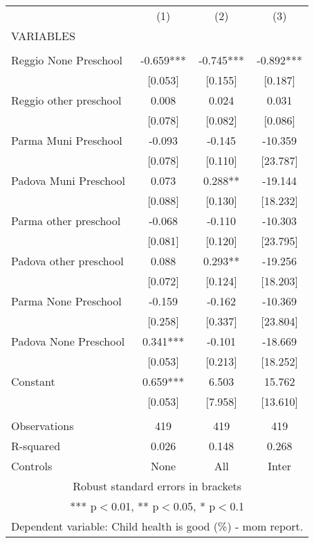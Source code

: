 \begin{tabular}{lccc} \hline
 & (1) & (2) & (3) \\
VARIABLES &  &  &  \\ \hline
 &  &  &  \\
Reggio None Preschool & -0.659*** & -0.745*** & -0.892*** \\
 & [0.053] & [0.155] & [0.187] \\
Reggio other preschool & 0.008 & 0.024 & 0.031 \\
 & [0.078] & [0.082] & [0.086] \\
Parma Muni Preschool & -0.093 & -0.145 & -10.359 \\
 & [0.078] & [0.110] & [23.787] \\
Padova Muni Preschool & 0.073 & 0.288** & -19.144 \\
 & [0.088] & [0.130] & [18.232] \\
Parma other preschool & -0.068 & -0.110 & -10.303 \\
 & [0.081] & [0.120] & [23.795] \\
Padova other preschool & 0.088 & 0.293** & -19.256 \\
 & [0.072] & [0.124] & [18.203] \\
Parma None Preschool & -0.159 & -0.162 & -10.369 \\
 & [0.258] & [0.337] & [23.804] \\
Padova None Preschool & 0.341*** & -0.101 & -18.669 \\
 & [0.053] & [0.213] & [18.252] \\
Constant & 0.659*** & 6.503 & 15.762 \\
 & [0.053] & [7.958] & [13.610] \\
 &  &  &  \\
Observations & 419 & 419 & 419 \\
R-squared & 0.026 & 0.148 & 0.268 \\
 Controls & None & All & Inter \\ \hline
\multicolumn{4}{c}{ Robust standard errors in brackets} \\
\multicolumn{4}{c}{ *** p$<$0.01, ** p$<$0.05, * p$<$0.1} \\
\multicolumn{4}{c}{ Dependent variable: Child health is good (\%) - mom report.} \\
\end{tabular}
